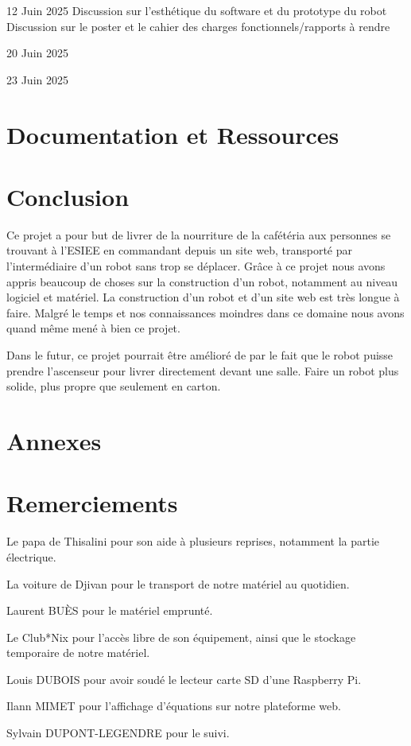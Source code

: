 \documentclass[a4paper,12pt]{report}  %
\begin{document}
12 Juin 2025
Discussion sur l’esthétique du software et du prototype du robot
Discussion sur le poster et le cahier des charges fonctionnels/rapports à rendre


20 Juin 2025



23 Juin 2025









\section{Documentation et Ressources}

\section{Conclusion}

Ce projet a pour but de livrer de la nourriture de la cafétéria aux personnes se trouvant à l’ESIEE en commandant depuis un site web, transporté par l’intermédiaire d’un robot sans trop se déplacer. Grâce à ce projet nous avons appris beaucoup de choses sur la construction d’un robot, notamment au niveau logiciel et matériel. La construction d’un robot et d’un site web est très longue à faire. Malgré le temps et nos connaissances moindres dans ce domaine nous avons quand même mené à bien ce projet.

Dans le futur, ce projet pourrait être amélioré de par le fait que le robot puisse prendre l’ascenseur pour livrer directement devant une salle. Faire un robot plus solide, plus propre que seulement en carton.

\section{Annexes}

\section{Remerciements}

Le papa de Thisalini pour son aide à plusieurs reprises, notamment la partie électrique.

La voiture de Djivan pour le transport de notre matériel au quotidien. 

Laurent BUÈS pour le matériel emprunté. 

Le Club*Nix pour l’accès libre de son équipement, ainsi que le stockage temporaire de notre matériel. 

Louis DUBOIS pour avoir soudé le lecteur carte SD d’une Raspberry Pi. 

Ilann MIMET pour l’affichage d’équations sur notre plateforme web. 

Sylvain DUPONT-LEGENDRE pour le suivi. 
\end{document}
